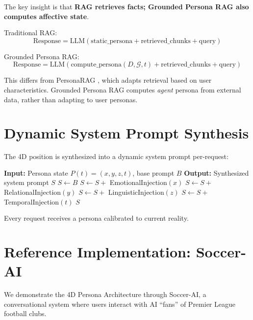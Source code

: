 \documentclass[11pt]{article}
\begin{document}
The key insight is that \textbf{RAG retrieves facts; Grounded Persona RAG also computes affective state}.

Traditional RAG:
\begin{equation}
\text{Response} = \text{LLM}(\text{static\_persona} + \text{retrieved\_chunks} + \text{query})
\end{equation}

Grounded Persona RAG:
\begin{equation}
\text{Response} = \text{LLM}(\text{compute\_persona}(D, \mathcal{G}, t) + \text{retrieved\_chunks} + \text{query})
\end{equation}

This differs from PersonaRAG \cite{personarag2024}, which adapts retrieval based on user characteristics. Grounded Persona RAG computes \textit{agent} persona from external data, rather than adapting to user personas.

\section{Dynamic System Prompt Synthesis}

The 4D position is synthesized into a dynamic system prompt per-request:

\begin{algorithm}
\caption{System Prompt Synthesis}
\begin{algorithmic}[1]
\STATE \textbf{Input:} Persona state $P(t) = (x, y, z, t)$, base prompt $B$
\STATE \textbf{Output:} Synthesized system prompt $S$
\STATE $S \leftarrow B$
\STATE $S \leftarrow S + $ EmotionalInjection$(x)$
    \STATE $S \leftarrow S + $ RelationalInjection$(y)$
\ENDIF
{}
    \STATE $S \leftarrow S + $ LinguisticInjection$(z)$
\ENDIF
{}
    \STATE $S \leftarrow S + $ TemporalInjection$(t)$
\ENDIF
\RETURN $S$
\end{algorithmic}
\end{algorithm}

Every request receives a persona calibrated to current reality.

\section{Reference Implementation: Soccer-AI}

We demonstrate the 4D Persona Architecture through Soccer-AI, a conversational system where users interact with AI ``fans'' of Premier League football clubs.
\end{document}
